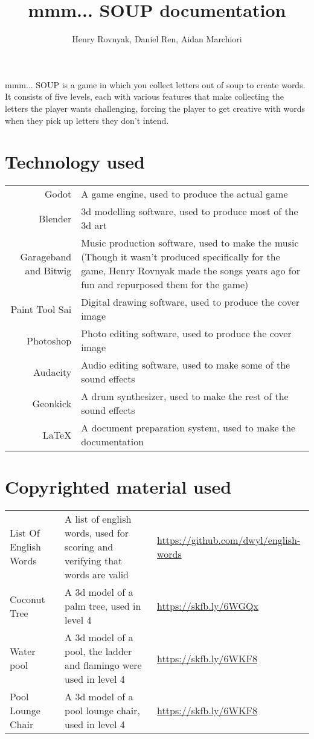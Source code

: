 \documentclass{article}
\title{mmm... SOUP documentation}
\author{Henry Rovnyak, Daniel Ren, Aidan Marchiori}
\begin{document}
	\maketitle
	
	mmm... SOUP is a game in which you collect letters out of soup to create words. It consists of five levels, each with various features that make collecting the letters the player wants challenging, forcing the player to get creative with words when they pick up letters they don't intend. 
	
	\section{Technology used}
	\begin{tabular}{r p{7cm}}
	Godot & A game engine, used to produce the actual game\\
	Blender & 3d modelling software, used to produce most of the 3d art\\
	Garageband and Bitwig & Music production software, used to make the music (Though it wasn't produced specifically for the game, Henry Rovnyak made the songs years ago for fun and repurposed them for the game)\\
	Paint Tool Sai & Digital drawing software, used to produce the cover image\\
	Photoshop & Photo editing software, used to produce the cover image\\
	Audacity & Audio editing software, used to make some of the sound effects\\
	Geonkick & A drum synthesizer, used to make the rest of the sound effects\\
	LaTeX & A document preparation system, used to make the documentation\\
	\end{tabular}
	
	\section{Copyrighted material used}
	\begin{tabular}{p{2cm} p{5cm} p{2cm}}
	List Of English Words & A list of english words, used for scoring and verifying that words are valid & \url{https://github.com/dwyl/english-words}\\
	Coconut Tree & A 3d model of a palm tree, used in level 4 & \url{https://skfb.ly/6WGQx}\\
	Water pool & A 3d model of a pool, the ladder and flamingo were used in level 4 & \url{https://skfb.ly/6WKF8}\\
	Pool Lounge Chair & A 3d model of a pool lounge chair, used in level 4 & \url{https://skfb.ly/6WKF8}\\
	\end{tabular}
\end{document}
